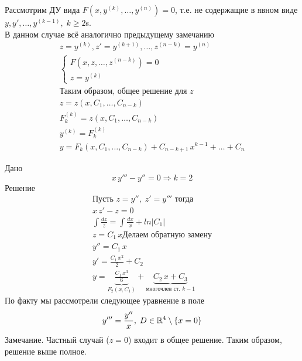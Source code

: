 \begin{Note}
    Рассмотрим ДУ вида $F(x, y^{(k)}, \dots, y^{(n)}) = 0$, т.е. не содержащие в явном виде $y, y', \dots, y^{(k - 1)}, \; k \geqslant 2$s.\\
    В данном случае всё аналогично предыдущему замечанию
    \begin{gather*}
        z = y^{(k)}, z' = y^{(k + 1)}, \dots, z^{(n-k)} = y^{(n)}\\
        \begin{cases}   
            F(x,z, \dots, z^{(n-k)}) = 0\\
            z = y^{(k)}
        \end{cases}\\
        \text{Таким образом, общее решение для } z\\
        z = z(x, C_1, \dots, C_{n-k})\\
        F_k^{(k)} = z(x, C_1, \dots, C_{n-k})\\
        y^{(k)} = F_k^{(k)}\\
        y = F_k(x, C_1, \dots, C_{n-k}) + C_{n-k+1}\,x^{k-1} + \dots + C_n
    \end{gather*}
\end{Note}

\begin{Example}
    Дано
    \[
        x \, y''' - y'' = 0 \Rightarrow k = 2
    \]
    Решение
    \begin{gather*}
        \text{Пусть } z = y'', \; z' = y''' \text{ тогда}\\
        x \, z' - z = 0\\
        \int \frac{dz}{z} = \int \frac{dx}{x} + ln|C_1|\\
        z = C_1\,x
        \text{Делаем обратную замену}\\
        y'' = C_1\,x\\
        y' = \frac{C_1 \, x^2}{2} + C_2\\
        y = \underbrace{\frac{C_1 \, x^3}{6}}_{F_2(x, C_1)} + \underbrace{C_2\,x + C_3}_{\text{многочлен ст. } k - 1}
    \end{gather*}
    По факту мы рассмотрели следующее уравнение в поле
    \[
        y''' = \frac{y''}{x}, \; D \in \mathbb{R}^4 \setminus \{x=0\}
    \]
    Замечание. Частный случай ($z = 0$) входит в общее решение. Таким образом, решение выше полное.
\end{Example}

